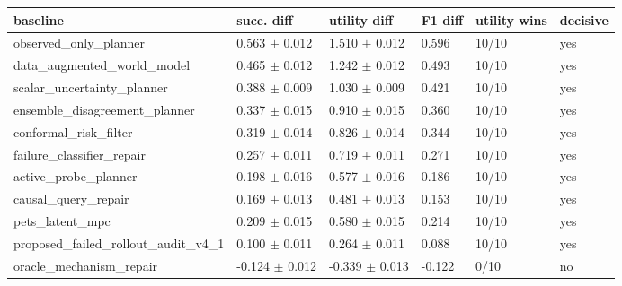 \begin{tabular}{llllll}
\toprule
baseline & succ. diff & utility diff & F1 diff & utility wins & decisive \\
\midrule
observed\_only\_planner & 0.563 $\pm$ 0.012 & 1.510 $\pm$ 0.012 & 0.596 & 10/10 & yes \\
data\_augmented\_world\_model & 0.465 $\pm$ 0.012 & 1.242 $\pm$ 0.012 & 0.493 & 10/10 & yes \\
scalar\_uncertainty\_planner & 0.388 $\pm$ 0.009 & 1.030 $\pm$ 0.009 & 0.421 & 10/10 & yes \\
ensemble\_disagreement\_planner & 0.337 $\pm$ 0.015 & 0.910 $\pm$ 0.015 & 0.360 & 10/10 & yes \\
conformal\_risk\_filter & 0.319 $\pm$ 0.014 & 0.826 $\pm$ 0.014 & 0.344 & 10/10 & yes \\
failure\_classifier\_repair & 0.257 $\pm$ 0.011 & 0.719 $\pm$ 0.011 & 0.271 & 10/10 & yes \\
active\_probe\_planner & 0.198 $\pm$ 0.016 & 0.577 $\pm$ 0.016 & 0.186 & 10/10 & yes \\
causal\_query\_repair & 0.169 $\pm$ 0.013 & 0.481 $\pm$ 0.013 & 0.153 & 10/10 & yes \\
pets\_latent\_mpc & 0.209 $\pm$ 0.015 & 0.580 $\pm$ 0.015 & 0.214 & 10/10 & yes \\
proposed\_failed\_rollout\_audit\_v4\_1 & 0.100 $\pm$ 0.011 & 0.264 $\pm$ 0.011 & 0.088 & 10/10 & yes \\
oracle\_mechanism\_repair & -0.124 $\pm$ 0.012 & -0.339 $\pm$ 0.013 & -0.122 & 0/10 & no \\
\bottomrule
\end{tabular}
